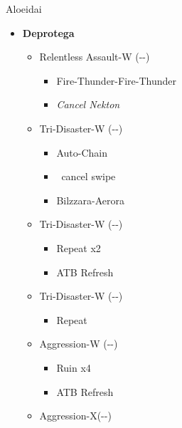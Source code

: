 \renewcommand{\first}{[1]Aggression-X(\com-\com-\nek)}
\renewcommand{\second}{[2] Aggression-W (\com-\com-\nek)}
\renewcommand{\third}{[3] Relentless Assault-W (\rav-\com-\nek)}
\renewcommand{\fourth}{[4] Patient Probing-W (\sen-\sen-\nek)}
\renewcommand{\fifth}{[5] Tri-Disaster-W (\rav-\rav-\nek)}
\renewcommand{\sixth}{[6] Tri-Disaster-W (\rav-\rav-\nek)}
\begin{battle}{Aloeidai}
  \begin{flushleft}
    \begin{itemize}
      \item \textbf{Deprotega}
            \begin{itemize}
              \item \third
                    \begin{itemize}
                      \item Fire-Thunder-Fire-Thunder
                      \item \textit{Cancel Nekton}
                    \end{itemize}
              \item \fifth
                    \begin{itemize}
                      \item Auto-Chain
                      \item \stagger\ cancel swipe
                      \item Bilzzara-Aerora
                    \end{itemize}
              \item \sixth
                    \begin{itemize}
                      \item Repeat x2
                      \item ATB Refresh
                    \end{itemize}
              \item \fifth
                    \begin{itemize}
                      \item Repeat
                    \end{itemize}
              \item \second
                    \begin{itemize}
                      \item Ruin x4
                      \item ATB Refresh
                    \end{itemize}
              \item \first

\end{itemize}
\end{itemize}
\end{flushleft}
\end{battle}

